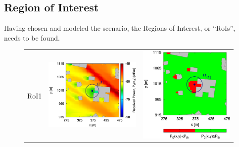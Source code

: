 \subsection{Region of Interest}
Having chosen and modeled the scenario, the Regions of Interest,
or {}``RoIs'', needs to be found. 
\begin{figure}[H]
\begin{center}
\begin{tabular}{ccc}
\begin{sideways}RoI1\end{sideways}&
\includegraphics[scale=0.1]{./Figure/Planning.EM/RoI1/1/Fig.Received.Power.ZOOM.H-QoS-01.Reference.jpg}&\includegraphics[scale=0.1]{./Figure/Planning.EM/RoI1/1/Fig.Received.Power.ZOOM.RoI.Reference.Threshold.-65dBm.jpg}\tabularnewline

\end{tabular}
\end{center}
\end{figure}
